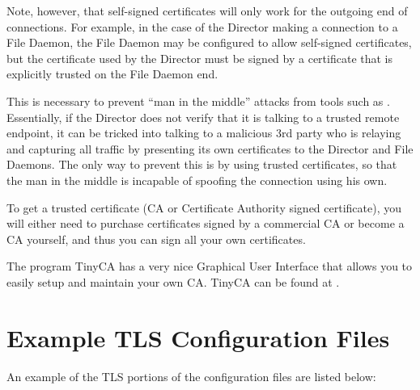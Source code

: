 Note, however, that self-signed certificates will only work for the
outgoing end of connections.  For example, in the case of the Director
making a connection to a File Daemon, the File Daemon may be configured to
allow self-signed certificates, but the certificate used by the
Director must be signed by a certificate that is explicitly trusted on the
File Daemon end.

This is necessary to prevent ``man in the middle'' attacks from tools such
as .  Essentially, if the
Director does not verify that it is talking to a trusted remote endpoint,
it can be tricked into talking to a malicious 3rd party who is relaying and
capturing all traffic by presenting its own certificates to the Director
and File Daemons.  The only way to prevent this is by using trusted
certificates, so that the man in the middle is incapable of spoofing the
connection using his own.

To get a trusted certificate (CA or Certificate Authority signed
certificate), you will either need to purchase certificates signed by a
commercial CA or become a CA
yourself, and thus you can sign all your own certificates.

The program TinyCA has a very nice Graphical User Interface
that allows you to easily setup and maintain your own CA.
TinyCA can be found at
.

\section{Example TLS Configuration Files}

An example of the TLS portions of the configuration
files are listed below:

